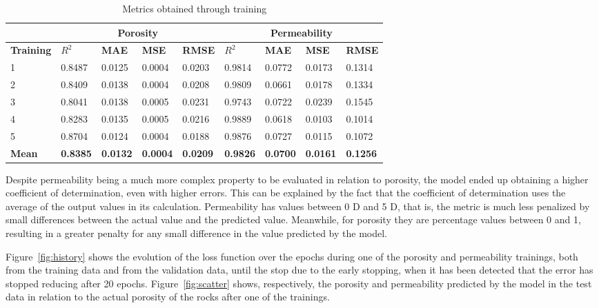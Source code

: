 \documentclass[a4paper,fleqn]{cas-sc}
\begin{document}
\begin{table}[h!]
	\caption{Metrics obtained through training}
	\label{tab:metrics}
	\centering%
	\begin{minipage}{.9\textwidth}
		\begin{tabular*}{\textwidth}{l|llll|llll}
			\hline
		    & \multicolumn{4}{c|}{\textbf{Porosity}} &  \multicolumn{4}{c}{\textbf{Permeability}}\\
			\hline
			\textbf{Training} & \textbf{$R^2$} & \textbf{MAE} & \textbf{MSE} & \textbf{RMSE} & \textbf{$R^2$} & \textbf{MAE} & \textbf{MSE} & \textbf{RMSE}\\
			\hline
			1 & 0.8487 & 0.0125 & 0.0004 & 0.0203 & 0.9814 & 0.0772 & 0.0173 & 0.1314\\
            2 & 0.8409 & 0.0138 & 0.0004 & 0.0208 & 0.9809 & 0.0661 & 0.0178 & 0.1334\\
            3 & 0.8041 & 0.0138	& 0.0005 & 0.0231 & 0.9743 & 0.0722	& 0.0239 & 0.1545\\
            4 & 0.8283 & 0.0135	& 0.0005 & 0.0216 & 0.9889 & 0.0618	& 0.0103 & 0.1014\\
            5 & 0.8704 & 0.0124 & 0.0004 & 0.0188 & 0.9876 & 0.0727	& 0.0115 & 0.1072\\
			\hline
			\textbf{Mean} & \textbf{0.8385} & \textbf{0.0132} & \textbf{0.0004} & \textbf{0.0209} & \textbf{0.9826} & \textbf{0.0700} & \textbf{0.0161} & \textbf{0.1256}\\
			\hline
		\end{tabular*}
	\end{minipage}
\end{table}


Despite permeability being a much more complex property to be evaluated in relation to porosity, the model ended up obtaining a higher coefficient of determination, even with higher errors. This can be explained by the fact that the coefficient of determination uses the average of the output values in its calculation. Permeability has values between 0 D and 5 D, that is, the metric is much less penalized by small differences between the actual value and the predicted value. Meanwhile, for porosity they are percentage values between 0 and 1, resulting in a greater penalty for any small difference in the value predicted by the model.

Figure~\ref{fig:history} shows the evolution of the loss function over the epochs during one of the porosity and permeability trainings, both from the training data and from the validation data, until the stop due to the early stopping, when it has been detected that the error has stopped reducing after 20 epochs. Figure~\ref{fig:scatter} shows, respectively, the porosity and permeability predicted by the model in the test data in relation to the actual porosity of the rocks after one of the trainings.
\end{document}
